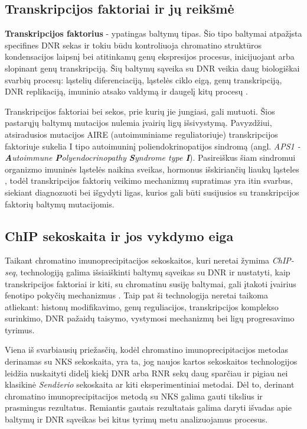 \documentclass[12pt]{article}
\begin{document}
\subsection{Transkripcijos faktoriai ir jų reikšmė}
\textbf{Transkripcijos faktorius} - ypatingas baltymų tipas. Šio tipo baltymai
atpažįsta specifines DNR sekas ir tokiu būdu kontroliuoja chromatino struktūros
kondensacijos laipsnį bei atitinkamų genų ekspresijos procesus, inicijuojant
arba slopinant genų transkripciją. Šių baltymų sąveika su DNR veikia daug
biologiškai svarbių procesų: ląstelių diferenciaciją, ląstelės ciklo eigą, genų
transkripciją, DNR replikaciją, imuninio atsako valdymą ir daugelį kitų
procesų \cite{ARTICLE10, ARTICLE11}.

Transkripcijos faktoriai bei sekos, prie kurių jie jungiasi, gali
mutuoti. Šios pastarųjų baltymų mutacijos nulemia įvairių ligų išsivystymą.
Pavyzdžiui, atsiradusios mutacijos AIRE (autoimuniniame reguliatoriuje)
transkripcijos faktoriuje sukelia I tipo autoimuninį poliendokrinopatijos
sindromą \cite{ARTICLE9} (angl. \emph{APS1 - \textbf{A}utoimmune
\textbf{P}olyendocrinopathy \textbf{S}yndrome type \textbf{I}}). Pasireiškus
šiam sindromui organizmo imuninės ląstelės naikina sveikas, hormonus
išskiriančių liaukų ląsteles \cite{ASP1}, todėl transkripcijos faktorių veikimo
mechanizmų supratimas yra itin svarbus, siekiant diagnozuoti bei išgydyti ligas,
kurios gali būti susijusios su transkripcijos faktorių baltymų mutacijomis.

\subsection{ChIP sekoskaita ir jos vykdymo eiga}
Taikant chromatino imunoprecipitacijos sekoskaitos, kuri neretai žymima
\emph{ChIP-seq}, technologiją galima išsiaiškinti baltymų sąveikas su DNR ir
nustatyti, kaip transkripcijos faktoriai ir kiti, su chromatinu susiję baltymai,
gali įtakoti įvairius fenotipo pokyčių mechanizmus \cite{ARTICLE2}. Taip pat
ši technologija neretai taikoma atliekant: histonų modifikavimo, genų
reguliacijos, trans\-krip\-ci\-jos komplekso surinkimo, DNR pažaidų taisymo,
vystymosi mechanizmų bei ligų progresavimo tyrimus.

Viena iš svarbiausių priežasčių, kodėl chromatino imunoprecipitacijos metodas
derinamas su NKS sekoskaita, yra ta, jog naujos kartos sekoskaitos technologijos
leidžia nuskaityti didelį kiekį DNR arba RNR sekų daug sparčiau ir pigiau nei
klasikinė \emph{Sendžerio} sekoskaita ar kiti eksperimentiniai metodai. Dėl to,
derinant chromatino imunoprecipitacijos metodą su NKS galima gauti tikslius ir
prasmingus rezultatus. Remiantis gautais rezultatais galima daryti išvadas apie
baltymų ir DNR sąveikas bei kitus tyrimų metu analizuojamus procesus.
\end{document}
